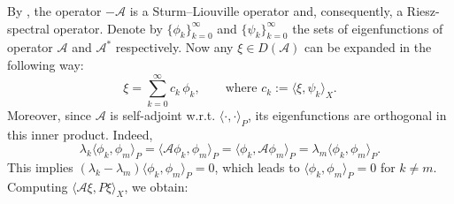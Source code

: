 \documentclass{mpi2015-cscpreprint}
\numberwithin{equation}{section}
\begin{document}
%
By \cite{DelDocWin2003}, the operator $-\mathcal{A}$ is a Sturm--Liouville operator and, consequently, a Riesz-spectral operator. Denote by $\{\phi_k\}_{k=0}^{\infty}$ and $\{\psi_k\}_{k=0}^{\infty}$ the sets of eigenfunctions of operator $\mathcal{A}$ and $\mathcal{A}^*$ respectively. Now any $\xi \in D(\mathcal{A})$ can be expanded in the following way:
\begin{equation*}
\xi = \sum_{k=0}^{\infty} c_k\,\phi_k, \qquad \text{where } c_k:=\langle \xi, \psi_k\rangle_{X}.
\end{equation*}
Moreover, since $\mathcal{A}$ is self-adjoint w.r.t. $\langle\cdot,\cdot\rangle_P$, its eigenfunctions are orthogonal in this inner product. Indeed,
\begin{equation*}
\lambda_k\langle\phi_k,\phi_m\rangle_P = \langle \mathcal{A}\phi_k,\phi_m\rangle_P = \langle\phi_k,\mathcal{A}\phi_m\rangle_P = \lambda_m\langle\phi_k,\phi_m\rangle_P.
\end{equation*}
This implies $(\lambda_k - \lambda_m)\langle\phi_k,\phi_m\rangle_P = 0$,
which leads to $\langle \phi_k, \phi_m\rangle_P = 0$ for  $k\neq m$.
Computing $\langle \mathcal{A}\xi, P\xi\rangle_{X}$, we obtain:
\end{document}
